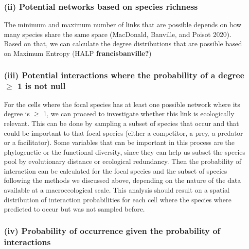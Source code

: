 \documentclass[12pt]{article}
\begin{document}
\hypertarget{ii-potential-networks-based-on-species-richness}{%
\subsubsection{(ii) Potential networks based on species
richness}\label{ii-potential-networks-based-on-species-richness}}

The minimum and maximum number of links that are possible depends on how
many species share the same space (MacDonald, Banville, and Poisot
2020). Based on that, we can calculate the degree distributions that are
possible based on Maximum Entropy (HALP \textbf{francisbanville?})

\hypertarget{iii-potential-interactions-where-the-probability-of-a-degree-ge-1-is-not-null}{%
\subsubsection{\texorpdfstring{(iii) Potential interactions where the
probability of a degree \(\ge\) 1 is not
null}{(iii) Potential interactions where the probability of a degree \textbackslash ge 1 is not null}}\label{iii-potential-interactions-where-the-probability-of-a-degree-ge-1-is-not-null}}

For the cells where the focal species has at least one possible network
where its degree is \(\ge\) 1, we can proceed to investigate whether
this link is ecologically relevant. This can be done by sampling a
subset of species that occur and that could be important to that focal
species (either a competitor, a prey, a predator or a facilitator). Some
variables that can be important in this process are the phylogenetic or
the functional diversity, since they can help us subset the species pool
by evolutionary distance or ecological redundancy. Then the probability
of interaction can be calculated for the focal species and the subset of
species following the methods we discussed above, depending on the
nature of the data available at a macroecological scale. This analysis
should result on a spatial distribution of interaction probabilities for
each cell where the species where predicted to occur but was not sampled
before.

\hypertarget{iv-probability-of-occurrence-given-the-probability-of-interactions}{%
\subsubsection{(iv) Probability of occurrence given the probability of
interactions}\label{iv-probability-of-occurrence-given-the-probability-of-interactions}}
\end{document}
